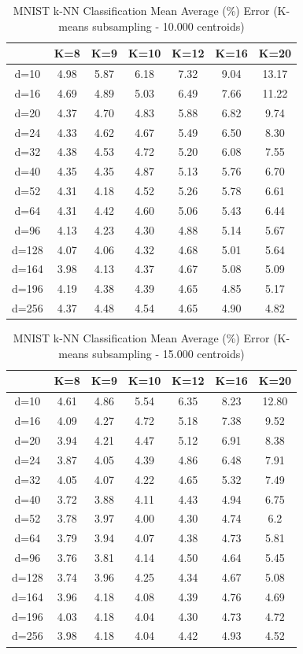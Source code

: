 \begin{table}[H]
\centering
\label{tab:table5}
\begin{tabular}{|c|c|c|c|c|c|c|}
\hline
& K=8 & K=9 & K=10 & K=12 & K=16 & K=20 \\
\hline
d=10 & 4.98 & 5.87 & 6.18 & 7.32 & 9.04 & 13.17 \\
d=16 & 4.69 & 4.89 & 5.03 & 6.49 & 7.66 & 11.22 \\
d=20 & 4.37 & 4.70 & 4.83 & 5.88 & 6.82 & 9.74 \\
d=24 & 4.33 & 4.62 & 4.67 & 5.49 & 6.50 & 8.30 \\
d=32 & 4.38 & 4.53 & 4.72 & 5.20 & 6.08 & 7.55 \\
d=40 & 4.35 & 4.35 & 4.87 & 5.13 & 5.76 & 6.70 \\
d=52 & 4.31 & 4.18 & 4.52 & 5.26 & 5.78 & 6.61 \\
d=64 & 4.31 & 4.42 & 4.60 & 5.06 & 5.43 & 6.44 \\
d=96 & 4.13 & 4.23 & 4.30 & 4.88 & 5.14 & 5.67 \\
d=128 & 4.07 & 4.06 & 4.32 & 4.68 & 5.01 & 5.64 \\
d=164 & 3.98 & 4.13 & 4.37 & 4.67 & 5.08 & 5.09 \\
d=196 & 4.19 & 4.38 & 4.39 & 4.65 & 4.85 & 5.17 \\
d=256 & 4.37 & 4.48 & 4.54 & 4.65 & 4.90 & 4.82 \\
\hline
\end{tabular}
\caption{MNIST k-NN Classification Mean Average (\%) Error (K-means subsampling - 10.000 centroids)}
\end{table}

\begin{table}[H]
\centering
\label{tab:table6}
\begin{tabular}{|c|c|c|c|c|c|c|}
\hline
& K=8 & K=9 & K=10 & K=12 & K=16 & K=20 \\
\hline
d=10 & 4.61 & 4.86 & 5.54 & 6.35 & 8.23 & 12.80 \\
d=16 & 4.09 & 4.27 & 4.72 & 5.18 & 7.38 & 9.52 \\
d=20 & 3.94 & 4.21 & 4.47 & 5.12 & 6.91 & 8.38 \\
d=24 & 3.87 & 4.05 & 4.39 & 4.86 & 6.48 & 7.91 \\
d=32 & 4.05 & 4.07 & 4.22 & 4.65 & 5.32 & 7.49 \\
d=40 & 3.72 & 3.88 & 4.11 & 4.43 & 4.94 & 6.75 \\
d=52 & 3.78 & 3.97 & 4.00 & 4.30 & 4.74 & 6.2 \\
d=64 & 3.79 & 3.94 & 4.07 & 4.38 & 4.73 & 5.81 \\
d=96 & 3.76 & 3.81 & 4.14 & 4.50 & 4.64 & 5.45 \\
d=128 & 3.74 & 3.96 & 4.25 & 4.34 & 4.67 & 5.08 \\
d=164 & 3.96 & 4.18 & 4.08 & 4.39 & 4.76 & 4.69 \\
d=196 & 4.03 & 4.18 & 4.04 & 4.30 & 4.73 & 4.72 \\
d=256 & 3.98 & 4.18 & 4.04 & 4.42 & 4.93 & 4.52 \\
\hline
\end{tabular}
\caption{MNIST k-NN Classification Mean Average (\%) Error (K-means subsampling - 15.000 centroids)}
\end{table}

